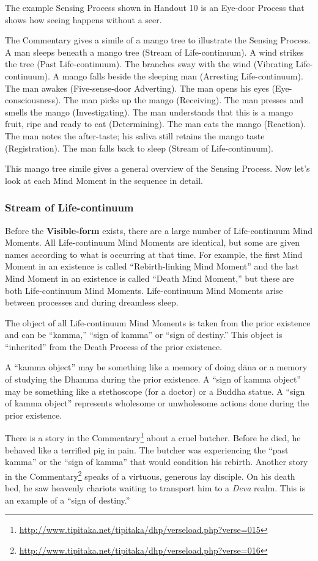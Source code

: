 The example Sensing Process shown in Handout 10 is an Eye-door Process that shows how seeing happens without a seer.

The Commentary gives a simile of a mango tree to illustrate the Sensing Process. A man sleeps beneath a mango tree (Stream of Life-continuum). A wind strikes the tree (Past Life-continuum). The branches sway with the wind (Vibrating Life-continuum). A mango falls beside the sleeping man (Arresting Life-continuum). The man awakes (Five-sense-door Adverting). The man opens his eyes (Eye-consciousness). The man picks up the mango (Receiving). The man presses and smells the mango (Investigating). The man understands that this is a mango fruit, ripe and ready to eat (Determining). The man eats the mango (Reaction). The man notes the after-taste; his saliva still retains the mango taste (Registration). The man falls back to sleep (Stream of Life-continuum).

This mango tree simile gives a general overview of the Sensing Process. Now let’s look at each Mind Moment in the sequence in detail.

\subsubsection*{Stream of Life-continuum}

Before the \textbf{Visible-form} exists, there are a large number of Life-continuum Mind Moments. All Life-continuum Mind Moments are identical, but some are given names according to what is occurring at that time. For example, the first Mind Moment in an existence is called “Rebirth-linking Mind Moment” and the last Mind Moment in an existence is called “Death Mind Moment,” but these are both Life-continuum Mind Moments. Life-continuum Mind Moments arise between processes and during dreamless sleep.

The object of all Life-continuum Mind Moments is taken from the prior existence and can be “kamma,” “sign of kamma” or “sign of destiny.” This object is “inherited” from the Death Process of the prior existence. 

A “kamma object” may be something like a memory of doing dāna or a memory of studying the Dhamma during the prior existence. A “sign of kamma object” may be something like a stethoscope (for a doctor) or a Buddha statue. A “sign of kamma object” represents wholesome or unwholesome actions done during the prior existence. 

There is a story in the Commentary\footnote{\url{http://www.tipitaka.net/tipitaka/dhp/verseload.php?verse=015}} about a cruel butcher. Before he died, he behaved like a terrified pig in pain. The butcher was experiencing the “past kamma” or the “sign of kamma” that would condition his rebirth. Another story in the Commentary\footnote{\url{http://www.tipitaka.net/tipitaka/dhp/verseload.php?verse=016}} speaks of a virtuous, generous lay disciple. On his death bed, he saw heavenly chariots waiting to transport him to a \textit{Deva} realm. This is an example of a “sign of destiny.”

